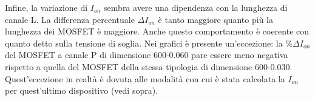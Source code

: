 Infine, la variazione di $I_{on}$ sembra avere una dipendenza con la lunghezza di canale L. La differenza percentuale $\Delta I_{on}$ è tanto maggiore quanto più la lunghezza dei MOSFET è maggiore. Anche questo comportamento è coerente con quanto detto sulla tensione di soglia. Nei grafici è presente un'eccezione: la $\% \Delta I_{on}$ del MOSFET a canale P di dimensione 600-0.060 pare essere meno negativa rispetto a quella del MOSFET della stessa tipologia di dimensione 600-0.030. Quest'eccezione in realtà è dovuta alle modalità con cui è stata calcolata la $I_{on}$ per quest'ultimo dispositivo (vedi sopra).

\FloatBarrier


